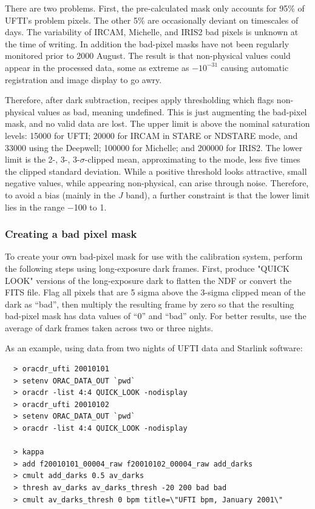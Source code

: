 \documentclass[twoside,11pt]{article}
\newcommand{\htmladdnormallink}[2]{#1}
\newcommand{\htmlref}[2]{#1}
\newcommand{\xlabel}[1]{}
\renewcommand{\_}{\texttt{\symbol{95}}}
\begin{document}
There are two problems.  First, the pre-calculated mask only accounts
for 95\% of UFTI's problem pixels.  The \htmladdnormallink{other 5\%
are occasionally deviant on timescales of 
days}{http://www.jach.hawaii.edu/JACpublic/UKIRT/instruments/ufti/badpixels.html}.
The variability of IRCAM, Michelle, and IRIS2 bad pixels is unknown at the
time of writing.  In addition the bad-pixel masks have not been
regularly monitored prior to 2000 August.  The result is that
non-physical values could appear in the processed data, some as
extreme as $-10^{-31}$ causing automatic registration and image
display to go awry.

Therefore, after \htmlref{dark subtraction}{dark_subtraction}, recipes
apply thresholding which flags non-physical values as bad, meaning
undefined.  This is just augmenting the bad-pixel mask, and no valid
data are lost.  The upper limit is above the nominal saturation
levels: 15000 for UFTI; 20000 for IRCAM in STARE or NDSTARE mode, and
33000 using the Deepwell; 100000 for Michelle; and 200000 for IRIS2.  The lower limit is
the 2-, 3-, 3-$\sigma$-clipped mean, approximating to the mode, less
five times the clipped standard deviation.  While a positive threshold
looks attractive, small negative values, while appearing non-physical,
can arise through noise. Therefore, to avoid a bias (mainly in the $J$
band), a further constraint is that the lower limit lies in the range
$-$100 to 1.

\subsubsection{\xlabel{create_bad_pixel}Creating a bad pixel mask\label{create_bad_pixel}}

To create your own bad-pixel mask for use with the calibration system,
perform the following steps using long-exposure dark frames.
First, produce "QUICK LOOK" versions of the long-exposure dark to flatten the NDF
or convert the FITS file.
Flag all pixels that are 5 sigma above the 3-sigma clipped mean of the dark
as ``bad'', then multiply the resulting frame by zero so that the resulting
bad-pixel mask has data values of ``0'' and ``bad'' only. For better results,
use the average of dark frames taken across two or three nights.

As an example, using data from two nights of UFTI data and Starlink software:

\begin{verbatim}
  > oracdr_ufti 20010101
  > setenv ORAC_DATA_OUT `pwd`
  > oracdr -list 4:4 QUICK_LOOK -nodisplay
  > oracdr_ufti 20010102
  > setenv ORAC_DATA_OUT `pwd`
  > oracdr -list 4:4 QUICK_LOOK -nodisplay
 
  > kappa
  > add f20010101_00004_raw f20010102_00004_raw add_darks
  > cmult add_darks 0.5 av_darks
  > thresh av_darks av_darks_thresh -20 200 bad bad
  > cmult av_darks_thresh 0 bpm title=\"UFTI bpm, January 2001\"
\end{verbatim}
\end{document}
